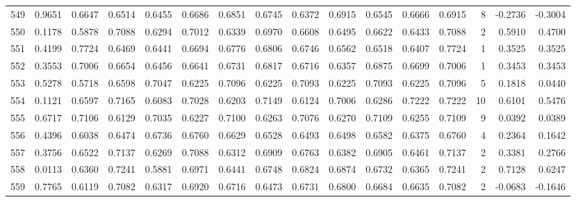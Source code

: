 \begin{tabular}{lrrrrrrrrrrrrrrr}
549 &      0.9651 &  0.6647 &  0.6514 &  0.6455 &  0.6686 &  0.6851 &  0.6745 &  0.6372 &  0.6915 &  0.6545 &   0.6666 &     0.6915 &      8 &                   -0.2736 &                    -0.3004 \\
550 &      0.1178 &  0.5878 &  0.7088 &  0.6294 &  0.7012 &  0.6339 &  0.6970 &  0.6608 &  0.6495 &  0.6622 &   0.6433 &     0.7088 &      2 &                    0.5910 &                     0.4700 \\
551 &      0.4199 &  0.7724 &  0.6469 &  0.6441 &  0.6694 &  0.6776 &  0.6806 &  0.6746 &  0.6562 &  0.6518 &   0.6407 &     0.7724 &      1 &                    0.3525 &                     0.3525 \\
552 &      0.3553 &  0.7006 &  0.6654 &  0.6456 &  0.6641 &  0.6731 &  0.6817 &  0.6716 &  0.6357 &  0.6875 &   0.6699 &     0.7006 &      1 &                    0.3453 &                     0.3453 \\
553 &      0.5278 &  0.5718 &  0.6598 &  0.7047 &  0.6225 &  0.7096 &  0.6225 &  0.7093 &  0.6225 &  0.7093 &   0.6225 &     0.7096 &      5 &                    0.1818 &                     0.0440 \\
554 &      0.1121 &  0.6597 &  0.7165 &  0.6083 &  0.7028 &  0.6203 &  0.7149 &  0.6124 &  0.7006 &  0.6286 &   0.7222 &     0.7222 &     10 &                    0.6101 &                     0.5476 \\
555 &      0.6717 &  0.7106 &  0.6129 &  0.7035 &  0.6227 &  0.7100 &  0.6263 &  0.7076 &  0.6270 &  0.7109 &   0.6255 &     0.7109 &      9 &                    0.0392 &                     0.0389 \\
556 &      0.4396 &  0.6038 &  0.6474 &  0.6736 &  0.6760 &  0.6629 &  0.6528 &  0.6493 &  0.6498 &  0.6582 &   0.6375 &     0.6760 &      4 &                    0.2364 &                     0.1642 \\
557 &      0.3756 &  0.6522 &  0.7137 &  0.6269 &  0.7088 &  0.6312 &  0.6909 &  0.6763 &  0.6382 &  0.6905 &   0.6461 &     0.7137 &      2 &                    0.3381 &                     0.2766 \\
558 &      0.0113 &  0.6360 &  0.7241 &  0.5881 &  0.6971 &  0.6441 &  0.6748 &  0.6824 &  0.6874 &  0.6732 &   0.6365 &     0.7241 &      2 &                    0.7128 &                     0.6247 \\
559 &      0.7765 &  0.6119 &  0.7082 &  0.6317 &  0.6920 &  0.6716 &  0.6473 &  0.6731 &  0.6800 &  0.6684 &   0.6635 &     0.7082 &      2 &                   -0.0683 &                    -0.1646 \\

\end{tabular}
